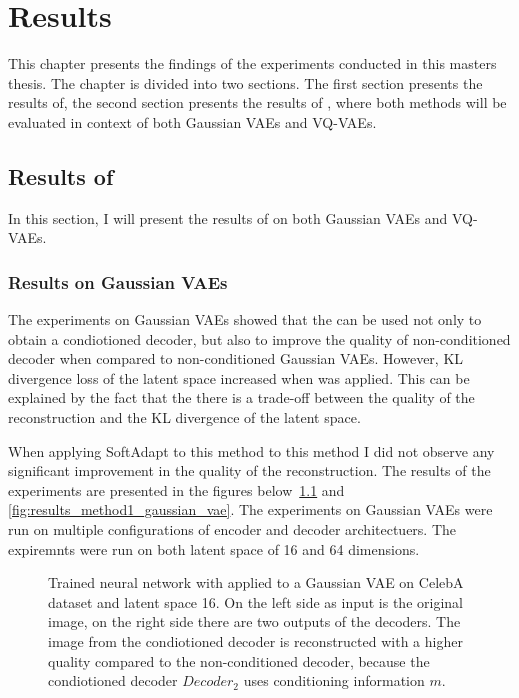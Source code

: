 \chapter{Results}

This chapter presents the findings of the experiments conducted in this masters thesis. The chapter is divided into two sections.
The first section presents the results of, the second section presents the results of ,
 where both methods will be evaluated in context of both Gaussian VAEs and VQ-VAEs.

\section{Results of }

In this section, I will present the results of  on both Gaussian VAEs and VQ-VAEs.

\subsection{Results on Gaussian VAEs}

The experiments on Gaussian VAEs showed that the  can be used not only to obtain a condiotioned decoder, but also to improve the quality of non-conditioned decoder when compared to non-conditioned Gaussian VAEs. However, KL divergence loss of the latent space increased when  was applied. This can be explained by the fact that the there is a trade-off between the quality of the reconstruction and the KL divergence of the latent space. 

When applying SoftAdapt to this method to this method I did not observe any significant improvement in the quality of the reconstruction. The results of the experiments are presented in the figures below\ \ref{fig:res_val} and \ref{fig:results_method1_gaussian_vae}.
The experiments on Gaussian VAEs were run on multiple configurations of encoder and decoder architectuers. The expiremnts were run on both latent space of 16 and 64 dimensions. 


\begin{figure}[H]
    \centering
    
    \caption[Trained neural network with  applied to a Gaussian VAE.]
    { 
        Trained neural network with  applied to a Gaussian VAE on CelebA dataset and latent space 16. 
        On the left side as input is the original image, on the right side there are two outputs of the decoders. 
        The image from the condiotioned decoder is reconstructed with a higher quality compared to the non-conditioned decoder, because the condiotioned decoder $Decoder_2$ uses conditioning information $m$.
    }
    \label{fig:res_val}
\end{figure}


